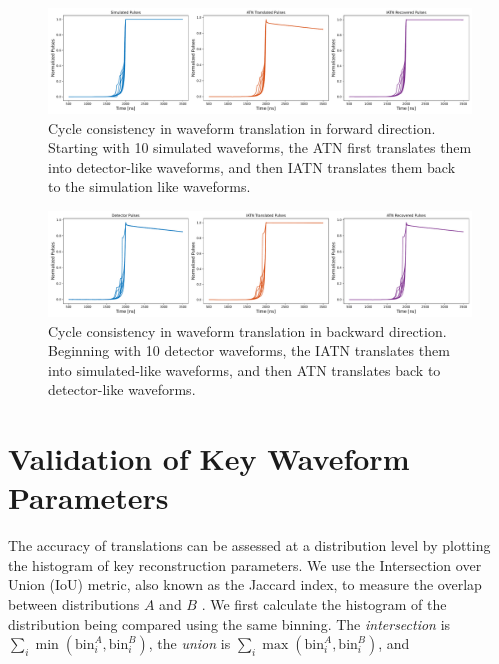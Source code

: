 \begin{figure}%
    \centering
    \includegraphics[width=0.99\linewidth]{ch8/figs/SEP_result_comp_1x3_cycle_BAB.pdf}
    \caption{Cycle consistency in waveform translation in forward direction. Starting with 10 simulated waveforms, the ATN first translates them into detector-like waveforms, and then IATN translates them back to the simulation like waveforms.}
    \label{fig:cycle_bab}
\end{figure}

\begin{figure}%
    \centering
    \includegraphics[width=0.99\linewidth]{ch8/figs/SEP_result_comp_1x3_cycle_ABA.pdf}
    \caption{Cycle consistency in waveform translation in backward direction. Beginning with 10 detector waveforms, the IATN translates them into simulated-like waveforms, and then ATN translates back to detector-like waveforms.}
    \label{fig:cycle_aba}
\end{figure}

\section{Validation of Key Waveform Parameters}
 The accuracy of translations can be assessed at a distribution level by plotting the histogram of key reconstruction parameters. We use the Intersection over Union (IoU) metric, also known as the Jaccard index, to measure the overlap between distributions $A$ and $B$ \cite{murphy1996finley, jaccard_index}. We first calculate the histogram of the distribution being compared using the same binning. The \textit{intersection} is $\sum_{i} \min(\text{bin}_i^A, \text{bin}_i^B)$, the \textit{union} is $\sum_{i} \max(\text{bin}_i^A, \text{bin}_i^B)$, and
 
